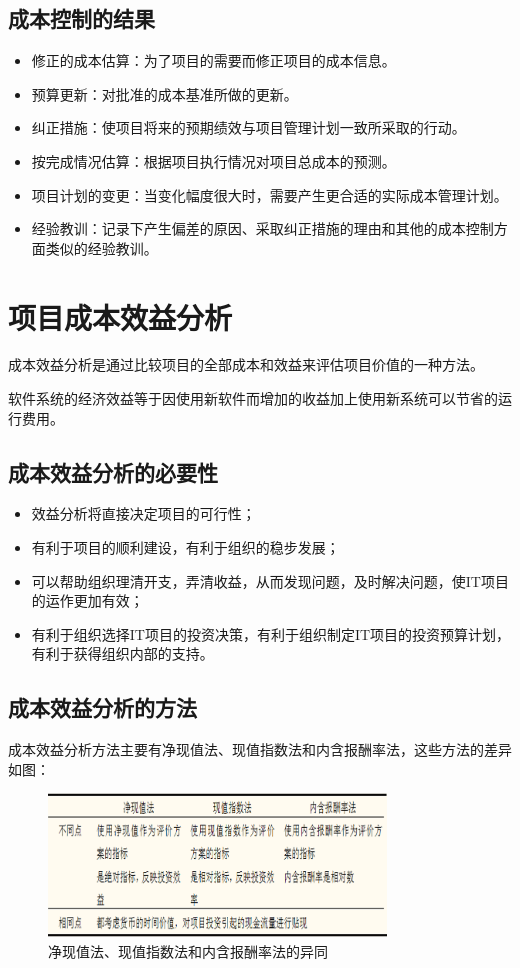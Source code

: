 \subsection{成本控制的结果}
\begin{itemize}
	\item 修正的成本估算：为了项目的需要而修正项目的成本信息。
	\item 预算更新：对批准的成本基准所做的更新。
	\item 纠正措施：使项目将来的预期绩效与项目管理计划一致所采取的行动。
	\item 按完成情况估算：根据项目执行情况对项目总成本的预测。
	\item 项目计划的变更：当变化幅度很大时，需要产生更合适的实际成本管理计划。
	\item 经验教训：记录下产生偏差的原因、采取纠正措施的理由和其他的成本控制方面类似的经验教训。
\end{itemize}
\section{项目成本效益分析}
成本效益分析是通过比较项目的全部成本和效益来评估项目价值的一种方法。
\par 软件系统的经济效益等于因使用新软件而增加的收益加上使用新系统可以节省的运行费用。
\subsection{成本效益分析的必要性}
\begin{itemize}
	\item 效益分析将直接决定项目的可行性；
	\item 有利于项目的顺利建设，有利于组织的稳步发展；
	\item 可以帮助组织理清开支，弄清收益，从而发现问题，及时解决问题，使IT项目的运作更加有效；
	\item 有利于组织选择IT项目的投资决策，有利于组织制定IT项目的投资预算计划，有利于获得组织内部的支持。
\end{itemize}
\subsection{成本效益分析的方法}
成本效益分析方法主要有净现值法、现值指数法和内含报酬率法，这些方法的差异如图：
\begin{figure}[!h]
	\centering
	\includegraphics[width=0.8\textwidth]{image/6-4}
	\caption{净现值法、现值指数法和内含报酬率法的异同}
\end{figure}
